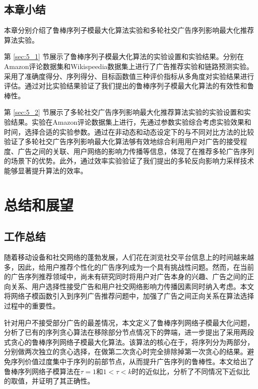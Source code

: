 \section{本章小结}

本章分别介绍了鲁棒序列子模最大化算法实验和多轮社交广告序列影响最大化推荐算法实验。

第 \ref{sec:5_1} 节展示了鲁棒序列子模最大化算法的实验设置和实验结果。分别在Amazon评论数据集和Wikispeedia数据集上进行了广告推荐实验和链路预测实验。采用了准确度得分、序列得分、目标函数值三种评价指标从多角度对实验结果进行评估。通过对比实验结果验证了我们提出的鲁棒序列子模最大化算法的有效性和鲁棒性。

第 \ref{sec:5_2} 节展示了多轮社交广告序列影响最大化推荐算法实验的实验设置和实验结果。实验在Amazon评论数据集上进行，先通过参数实验综合考虑实验效果和时间，选择合适的实验参数。通过在非动态和动态设定下的与不同对比方法的比较验证了多轮社交广告序列影响最大化算法够有效地综合利用用户对广告的接受程度、广告之间的关联、用户网络的影响力传播等信息，体现了在推荐多轮广告序列的场景下的优势。此外，通过效率实验验证了我们提出的多轮反向影响力采样技术能够显著提升算法的效率。

\chapter{总结和展望}

\section{工作总结}

随着移动设备和社交网络的蓬勃发展，人们花在浏览社交平台信息上的时间越来越多，因此，给用户推荐个性化的广告序列成为一个具有挑战性问题。然而，在当前的广告序列推荐领域中，尚未有研究同时将用户对广告本身的兴趣、广告之间的正向关系、用户选择性接受广告和用户社交网络影响力传播因素同时纳入考虑。本文将网络子模函数引入到序列广告推荐问题中，加强了广告之间正向关系在算法选择过程中的重要性。

针对用户不接受部分广告的最差情况，本文定义了鲁棒序列网络子模最大化问题，分析了已有的序列贪心算法在移除部分节点情况下的弊端，进一步提出了采用两段式贪心的鲁棒序列网络子模最大化算法。该算法的核心在于，将序列分为两部分，分别做两次独立的贪心选择，在做第二次贪心时完全排除掉第一次贪心的结果。避免序列价值过度集中于序列的前部节点，从而提升广告序列的鲁棒性。本文给出了鲁棒序列网络子模算法在$\tau = 1$和$1 < \tau < k$时的近似比，分析了不同情况下近似比的取值，并证明了其正确性。

